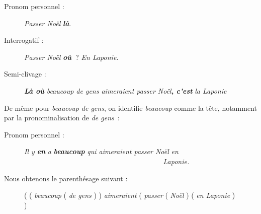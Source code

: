 \begin{description}
\item[Pronom personnel :] \textit{Passer Noël} \textbf{\textit{là}}.
\item[Interrogatif :] \textit{Passer Noël} \textbf{\textit{où~}}? \textit{En Laponie.}
\item[Semi-clivage :]  \textbf{\textit{Là où}} \textit{beaucoup de gens aimeraient passer Noël}\textbf{, \textit{c’est}} \textit{la Laponie}
\end{description}
De même pour \textit{beaucoup de gens}, on identifie \textit{beaucoup} comme la tête, notamment par la pronominalisation de \textit{de gens~}:
\begin{description}
\item[Pronom personnel :] \textit{Il y} \textbf{\textit{en}} \textit{a} \textbf{\textit{beaucoup}} \textit{qui aimeraient passer Noël} \textit{en}   \textit{~~~~~~~~~~~~~~~~~~~~~~~~~~~~~~~~~~~~~~}  \textit{Laponie.}
\end{description}

Nous obtenons le parenthésage suivant :

\begin{figure}
      ( ( \textit{beaucoup}  ( \textit{de gens} ) )  \textit{aimeraient}  ( \textit{passer}  ( \textit{Noël} ) ( \textit{en Laponie} ) )
      \caption{\label{fig:}}
\end{figure}

